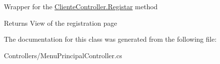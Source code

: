 Wrapper for the \mbox{\hyperlink{classmvc_j_j_m_s_1_1_controllers_1_1_cliente_controller_a31325ea0231ffa6f09996a9f61f1731b}{Cliente\+Controller.\+Registar}} method 

\begin{DoxyReturn}{Returns}
View of the registration page
\end{DoxyReturn}


The documentation for this class was generated from the following file\+:\begin{DoxyCompactItemize}
\item 
Controllers/Menu\+Principal\+Controller.\+cs\end{DoxyCompactItemize}
